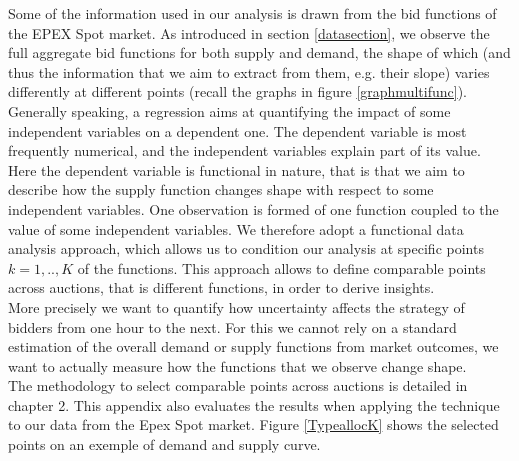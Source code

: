 Some of the information used in our analysis is drawn from the bid functions of the EPEX Spot market. As introduced in section \ref{datasection}, we observe the full aggregate %
bid functions for both supply and demand, %
the shape of which %
(and thus the information that we aim to extract from them, e.g. their slope) varies differently at different points (recall the graphs in figure \ref{graphmultifunc}). \\%
Generally speaking, a regression aims at quantifying the impact of some independent variables on a dependent one. The dependent variable is most frequently numerical, and the independent variables explain part of its value. Here the dependent variable is functional in nature, that is that we aim to describe how the supply function changes shape with respect to some independent variables. One observation is formed of one function coupled to the value of some independent variables. We therefore adopt a functional data analysis approach, which allows us to condition our analysis at specific points $k=1,..,K$ of the functions.
This approach allows to define comparable points across auctions, that is different functions, in order to derive insights.   \\

More precisely we want to quantify how uncertainty affects the strategy of bidders from one hour to the next. For this we cannot rely on a standard estimation of the overall demand or supply functions from market outcomes, we want to actually measure how the functions that we observe change shape. \\

The methodology to select comparable points across auctions is detailed in chapter 2. 
This appendix also evaluates the results when applying the technique to our data from the Epex Spot market. Figure \ref{TypeallocK} shows the selected points on an exemple of demand and supply curve. \\

